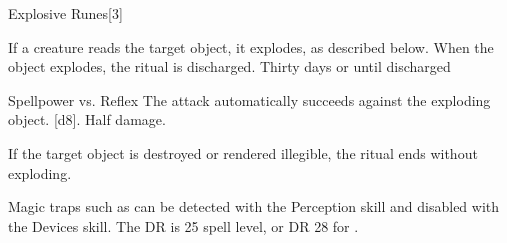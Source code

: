 \begin{spellsection}{Explosive Runes}[3]
    \begin{spellheader}
    \end{spellheader}
    \begin{spellcontent}
        \begin{spelltargetinginfo}
            \spellrng{\rngtouch}
        \end{spelltargetinginfo}
        \begin{spelleffects}
            \spelleffect If a creature reads the target object, it explodes, as described below. When the object explodes, the ritual is discharged.
            \spelldur Thirty days or until discharged \dismissable
        \end{spelleffects}
    \end{spellcontent}
    \begin{spellsubcontent}
        \begin{spelltargetinginfo}
        \end{spelltargetinginfo}
        \begin{spelleffects}
            \begin{spellattack}{Spellpower vs. Reflex}
                \spellspecial The attack automatically succeeds against the exploding object.
                \spellsuccess {}[d8].
                \spellfailure Half damage.
            \end{spellattack}
        \end{spelleffects}
    \end{spellsubcontent}
    \begin{spellfooter}
        \spellnotes If the target object is destroyed or rendered illegible, the ritual ends without exploding.

        Magic traps such as  can be detected with the Perception skill and disabled with the Devices skill. The DR is 25 \add spell level, or DR 28 for .
    \end{spellfooter}
    \begin{spellaugments}
    \end{spellaugments}
\end{spellsection}

